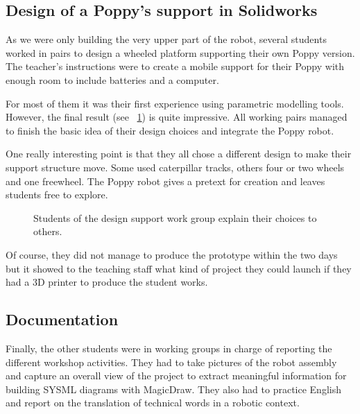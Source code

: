 \subsection{Design of a Poppy's support in Solidworks} %

As we were only building the very upper part of the robot, several students worked in pairs to design a wheeled platform supporting their own Poppy version. The teacher’s instructions were to create a mobile support for their Poppy with enough room to include batteries and a computer.

For most of them it was their first experience using parametric modelling tools. However, the final result (see \figurename~\ref{fig:saintonge_support}) is quite impressive. All working pairs managed to finish the basic idea of their design choices and integrate the Poppy robot.

One really interesting point is that they all chose a different design to make their support structure move. Some used caterpillar tracks, others four or two wheels and one freewheel. The Poppy robot gives a pretext for creation and leaves students free to explore.

\begin{figure}[tb]
\centering
    \hfil
    \hfil
    \caption{Students of the design support work group explain their choices to others.}
    \label{fig:saintonge_support}
\end{figure}

Of course,  they did not manage to produce the prototype within the two days but it showed to the teaching staff what kind of project they could launch if they had a 3D printer to produce the student works.

\subsection{Documentation } %

Finally, the other students were in working groups in charge of reporting the different workshop activities. They had to take pictures of the robot assembly and capture an overall view of the project to extract meaningful information for building SYSML diagrams with MagicDraw. They also had to practice English and report on the translation of technical words in a robotic context.

